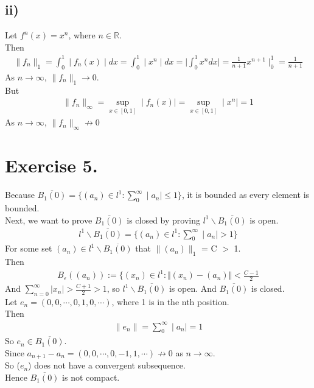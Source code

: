 \documentclass{article}
\begin{document}
\subsection*{ii)}
Let $f^n(x)=x^n$, where $n\in \mathbb{R}$.\\
Then
\begin{align*}
\|f_n\|_1=\int^1_0\mid f_n(x)\mid dx=\int^1_0\mid x^n\mid dx=\mid \int^1_0 x^n dx\mid=\frac{1}{n+1}x^{n+1}\mid^1_0=\frac{1}{n+1}
\end{align*}
As $n\rightarrow \infty$, $\|f_n\|_1\rightarrow0$.\\
But
\begin{align*}
\|f_n\|_{\infty}=\mathop{sup}_{x\in[0,1]}\mid f_n(x)\mid=\mathop{sup}_{x\in[0,1]}\mid x^n\mid=1
\end{align*}
As $n\rightarrow \infty$, $\|f_n\|_{\infty}\not\rightarrow0$

\section*{Exercise 5.}
Because $\overline{B_1(0)}=\lbrace(a_n)\in l^1:\displaystyle{\sum_0^\infty \mid a_n\mid\leq1}\rbrace$, it is bounded as every element is bounded.\\
Next, we want to prove $\overline{B_1(0)}$ is closed by proving $l^1\backslash\overline{B_1(0)}$ is open.\\
\begin{align*}
l^1\backslash\overline{B_1(0)}=\lbrace(a_n)\in l^1:\displaystyle{\sum_0^\infty \mid a_n\mid>1}\rbrace
\end{align*}
For some set $(a_n)\in l^1\backslash\overline{B_1(0)}$ that $\|(a_n)\|_1$ = C $>$ 1.\\
Then 
\begin{align*}
B_{\varepsilon}((a_n)):=\lbrace(x_n)\in l^1:\Vert (x_n)-(a_n)\Vert <\frac{C-1}{2}
\end{align*}
And $\displaystyle{\sum^\infty_{n=0}}\vert x_n\vert>\frac{C+1}{2}>1$, so $l^1\backslash\overline{B_1(0)}$ is open. And $\overline{B_1(0)}$ is closed.\\
Let $e_n=(0,0,\cdots,0,1,0,\cdots)$, where 1 is in the nth position.\\
Then
\begin{align*}
\| e_n\|=\displaystyle{\sum_0^\infty} \mid a_n\mid=1
\end{align*}
So $e_n\in\overline{B_1(0)}$.\\
Since $a_{n+1}-a_n=(0,0,\cdots,0,-1,1,\cdots)\not\rightarrow0$ as $n\rightarrow\infty$. \\
So ($e_n$) does not have a convergent subsequence.\\
Hence $\overline{B_1(0)}$ is not compact.
\end{document}
